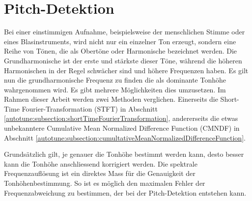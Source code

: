 %
%
%
%
\section{Pitch-Detektion
\label{autotune:section:pitchDetektion}}
Bei einer einstimmigen Aufnahme, beispielsweise der menschlichen Stimme oder eines Blasinstruments,
wird nicht nur ein einzelner Ton erzeugt, sondern eine Reihe von Tönen, die als Obertöne oder Harmonische bezeichnet werden.
Die Grundharmonische ist der erste und stärkste dieser Töne, während die höheren Harmonischen in der Regel schwächer sind und höhere Frequenzen haben.
Es gilt nun die grundharmonische Frequenz zu finden die als dominante Tonhöhe wahrgenommen wird.
Es gibt mehrere Möglichkeiten dies umzusetzen.
Im Rahmen dieser Arbeit werden zwei Methoden verglichen.
Einerseits die Short-Time Fourier-Transformation (STFT) in Abschnitt \ref{autotune:subsection:shortTimeFourierTransformation},
andererseits die etwas unbekanntere Cumulative Mean Normalized Difference Function (CMNDF) in Abschnitt \ref{autotune:subsection:cumultativeMeanNormalizedDifferenceFunction}.

Grundsätzlich gilt, je genauer die Tonhöhe bestimmt werden kann, desto besser kann die Tonhöhe anschliessend korrigiert werden.
Die spektrale Frequenzauflösung ist ein direktes Mass für die Genauigkeit der Tonhöhenbestimmung.
So ist es möglich den maximalen Fehler der Frequenzabweichung zu bestimmen, der bei der Pitch-Detektion entstehen kann.


